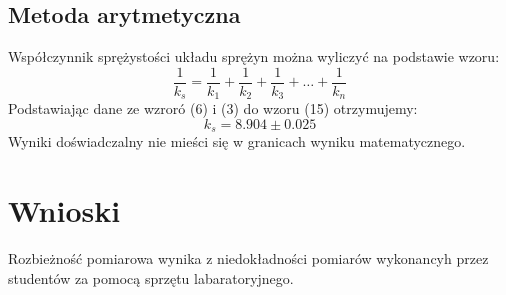 \documentclass{article} %
\begin{document}
\subsection{Metoda arytmetyczna}
Współczynnik sprężystości układu sprężyn można wyliczyć na podstawie wzoru:
{\large
\begin{equation}
    \frac{1}{k_s} = \frac{1}{k_1}+\frac{1}{k_2}+\frac{1}{k_3}+\dots+\frac{1}{k_n}
\end{equation}
}
Podstawiając dane ze wzroró (6) i (3) do wzoru (15) otrzymujemy:
{\large
\begin{equation}
    k_s = 8.904\pm0.025
\end{equation}
}
Wyniki doświadczalny nie mieści się w granicach wyniku matematycznego.
\section{Wnioski}
Rozbieżność pomiarowa wynika z niedokładności pomiarów wykonancyh przez studentów za pomocą sprzętu labaratoryjnego.
\begin{comment}
\subsection{Opis doświadczenia}
\subsection{Wyprowadzenie wzorów}
\subsection{Niepewność pomiarowa}
\subsection{Wyniki pomiarów}
\subsection{Wyniki doświadczenia}
\subsection{Wyznaczenie współczynnika sprężystości $k$}
\end{comment}
\end{document}
